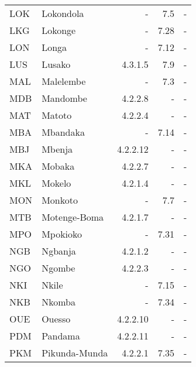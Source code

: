 {{\begin{longtable}{@{}llrrr@{}}
LOK &              Lokondola &           - &           7.5 &                    - \\
LKG &                Lokonge &           - &          7.28 &                    - \\
LON &                  Longa &           - &          7.12 &                    - \\
LUS &                 Lusako &     4.3.1.5 &           7.9 &                    - \\
MAL &              Malelembe &           - &           7.3 &                    - \\
MDB &               Mandombe &     4.2.2.8 &             - &                    - \\
MAT &                 Matoto &     4.2.2.4 &             - &                    - \\
MBA &               Mbandaka &           - &          7.14 &                    - \\
MBJ &                 Mbenja &    4.2.2.12 &             - &                    - \\
MKA &                 Mobaka &     4.2.2.7 &             - &                    - \\
MKL &                 Mokelo &     4.2.1.4 &             - &                    - \\
MON &                Monkoto &           - &           7.7 &                    - \\
MTB &           Motenge-Boma &     4.2.1.7 &             - &                    - \\
MPO &               Mpokioko &           - &          7.31 &                    - \\
NGB &                \mbox{Ngbanja} &     4.2.1.2 &             - &                    - \\
NGO &                 Ngombe &     4.2.2.3 &             - &                    - \\
NKI &                  Nkile &           - &          7.15 &                    - \\
NKB &                 Nkomba &           - &          7.34 &                    - \\
OUE &                 Ouesso &    4.2.2.10 &             - &                    - \\
PDM &                Pandama &    4.2.2.11 &             - &                    - \\
PKM &          Pikunda-Munda &     4.2.2.1 &          7.35 &                    - \\

\end{longtable}}}
